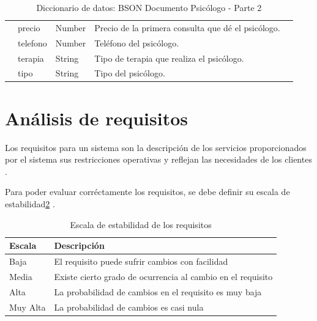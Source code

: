 \begin{table}[htpb]
\begin{tabularx}{\textwidth}{|l|X|X|X|X|}
                                      & precio         & Number                & Precio de la primera consulta que dé el psicólogo.            \\ \cline{2-4} 
                                      & telefono       & Number                & Teléfono del psicólogo.                                       \\ \cline{2-4} 
                                      & terapia        & String                & Tipo de terapia que realiza el psicólogo.                     \\ \cline{2-4} 
                                      & tipo           & String                & Tipo del psicólogo.                                           \\ \hline
\end{tabularx}
\caption{Diccionario de datos: BSON Documento Psicólogo - Parte 2}
\label{fig:dic_datos_BSON_4}
\end{table}


\section{Análisis de requisitos}


Los requisitos para un sistema son la descripción de los servicios proporcionados por el sistema sus restricciones operativas y reflejan las necesidades de los clientes \cite{sommerville}.


Para poder evaluar corréctamente los requisitos, se debe definir su escala de estabilidad\ref{esc_estab} \cite{sommerville}.


\begin{table}[htpb]
\centering
\begin{tabularx}{\textwidth}{|l|X|}
\hline
\textbf{Escala}   & \textbf{Descripción}                                                 \\ \hline
Baja     & El requisito puede sufrir cambios con facilidad             \\ \hline
Media    & Existe cierto grado de ocurrencia al cambio en el requisito \\ \hline
Alta     & La probabilidad de cambios en el requisito es muy baja      \\ \hline
Muy Alta & La probabilidad de cambios es casi nula                     \\ \hline
\end{tabularx}
\caption{Escala de estabilidad de los requisitos}
\label{esc_estab}
\end{table}


